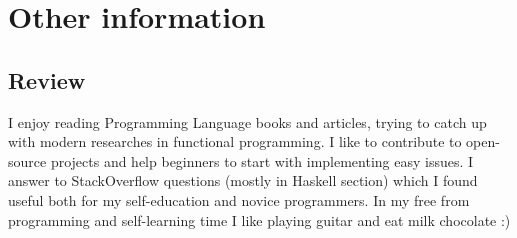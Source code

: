 \documentclass[letterpaper]{twentysecondcv} %
\begin{document}

\section{Other information}

\subsection{Review}

I enjoy reading Programming Language books and articles, trying to catch up with modern researches in functional programming. I like to contribute to open-source projects and help beginners to start with implementing easy issues. I answer to StackOverflow questions (mostly in Haskell section) which I found useful both for my self-education and novice programmers. In my free from programming and self-learning time I like playing guitar and eat milk chocolate :)






\end{document}
